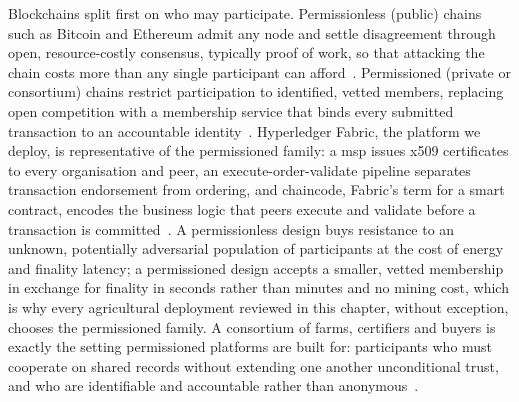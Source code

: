 \documentclass[12pt,a4paper,oneside]{book}
\begin{document}
Blockchains split first on who may participate. Permissionless (public)
chains such as Bitcoin and Ethereum admit any node and settle disagreement
through open, resource-costly consensus, typically proof of work, so that
attacking the chain costs more than any single participant can
afford~\cite{melo2024unlockingblockchain, anon2024securitysecp}.
Permissioned (private or consortium) chains restrict participation to
identified, vetted members, replacing open competition with a membership
service that binds every submitted transaction to an accountable
identity~\cite{jayaram2023hyperledger, krstic2020hyperledgerframeworks}.
Hyperledger Fabric, the platform we deploy, is representative of
the permissioned family: a \gls{msp} issues \gls{x509} certificates to
every organisation and peer, an execute-order-validate pipeline separates
transaction endorsement from ordering, and chaincode, Fabric's term for a
smart contract, encodes the business logic that peers execute and validate
before a transaction is committed~\cite{jayaram2023hyperledger,
mediumChaincode}. A permissionless design buys resistance to an unknown,
potentially adversarial population of participants at the cost of energy
and finality latency; a permissioned design accepts a smaller, vetted
membership in exchange for finality in seconds rather than minutes and no
mining cost, which is why every agricultural deployment reviewed in this
chapter, without exception, chooses the permissioned family. A consortium
of farms, certifiers and buyers is exactly the setting permissioned
platforms are built for: participants who must cooperate on shared records
without extending one another unconditional trust, and who are identifiable
and accountable rather than anonymous~\cite{debruyne2022trust,
kumar2024collaborativenetworks}.
\end{document}
